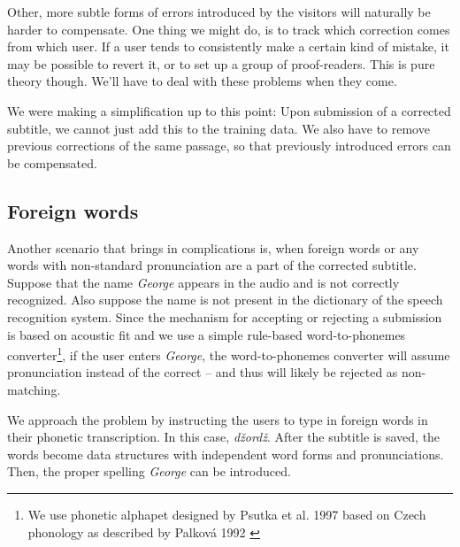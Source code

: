 \documentclass{llncs}
\begin{document}
Other, more subtle forms of errors introduced by the visitors will naturally be
harder to compensate. One thing we might do, is to track which correction comes from
which user. If a user tends to consistently make a certain kind of mistake, it
may be possible to revert it, or to set up a group of proof-readers. This is
pure theory though. We'll have to deal with these problems when they come.

We were making a simplification up to this point: Upon submission of a corrected
subtitle, we cannot just add this to the training data. We also have to remove
previous corrections of the same passage, so that previously introduced errors
can be compensated.

\subsection{Foreign words}

Another scenario that brings in complications is, when foreign words or any
words with non-standard pronunciation are a part of the corrected subtitle.
Suppose that the name \emph{George} appears in the audio and is not correctly
recognized. Also suppose the name is not present in the dictionary of the speech
recognition system. Since the mechanism for accepting or rejecting a submission
is based on acoustic fit and we use a simple rule-based word-to-phonemes
converter\footnote{We use phonetic alphapet designed by Psutka et al. 1997
\cite{czphabc} based on Czech phonology as described by Palková 1992 \cite{czphon}},
if the user enters \emph{George}, the word-to-phonemes
converter will assume pronunciation  instead of the correct
 -- and thus will likely be rejected as non-matching.

We approach the problem by instructing the users to type in foreign words in
their phonetic transcription. In this case, \emph{džordž}. After the subtitle is
saved, the words become data structures with independent word forms and
pronunciations. Then, the proper spelling \emph{George} can be introduced.

%
%
\end{document}
